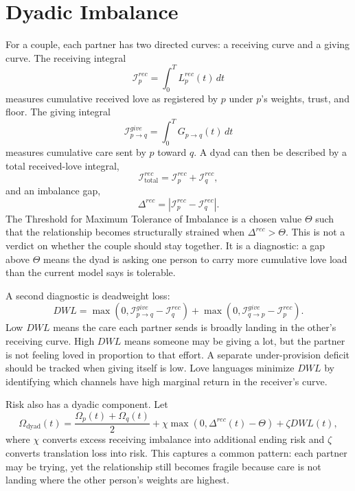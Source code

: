 \documentclass[11pt]{article}
\newcommand{\Risk}{\Omega}
\begin{document}
\section{Dyadic Imbalance}
For a couple, each partner has two directed curves: a receiving curve and a giving curve. The receiving integral
\begin{equation}
\mathcal{I}_p^{rec}=\int_{0}^{T} L_p^{rec}(t)\,dt
\end{equation}
measures cumulative received love as registered by $p$ under $p$'s weights, trust, and floor. The giving integral
\begin{equation}
\mathcal{I}_{p\rightarrow q}^{give}=\int_{0}^{T} G_{p\rightarrow q}(t)\,dt
\end{equation}
measures cumulative care sent by $p$ toward $q$. A dyad can then be described by a total received-love integral,
\begin{equation}
\mathcal{I}_{\mathrm{total}}^{rec}=\mathcal{I}_p^{rec}+\mathcal{I}_q^{rec},
\end{equation}
and an imbalance gap,
\begin{equation}
\Delta^{rec}=\left|\mathcal{I}_p^{rec}-\mathcal{I}_q^{rec}\right|.
\end{equation}
The Threshold for Maximum Tolerance of Imbalance is a chosen value $\Theta$ such that the relationship becomes structurally strained when $\Delta^{rec}>\Theta$. This is not a verdict on whether the couple should stay together. It is a diagnostic: a gap above $\Theta$ means the dyad is asking one person to carry more cumulative love load than the current model says is tolerable.

A second diagnostic is deadweight loss:
\begin{equation}
DWL=\max(0,\mathcal{I}_{p\rightarrow q}^{give}-\mathcal{I}_q^{rec})+\max(0,\mathcal{I}_{q\rightarrow p}^{give}-\mathcal{I}_p^{rec}).
\end{equation}
Low $DWL$ means the care each partner sends is broadly landing in the other's receiving curve. High $DWL$ means someone may be giving a lot, but the partner is not feeling loved in proportion to that effort. A separate under-provision deficit should be tracked when giving itself is low. Love languages minimize $DWL$ by identifying which channels have high marginal return in the receiver's curve.

Risk also has a dyadic component. Let
\begin{equation}
\Risk_{\mathrm{dyad}}(t)=\frac{\Risk_p(t)+\Risk_q(t)}{2}+\chi\max(0,\Delta^{rec}(t)-\Theta)+\zeta DWL(t),
\end{equation}
where $\chi$ converts excess receiving imbalance into additional ending risk and $\zeta$ converts translation loss into risk. This captures a common pattern: each partner may be trying, yet the relationship still becomes fragile because care is not landing where the other person's weights are highest.
\end{document}
